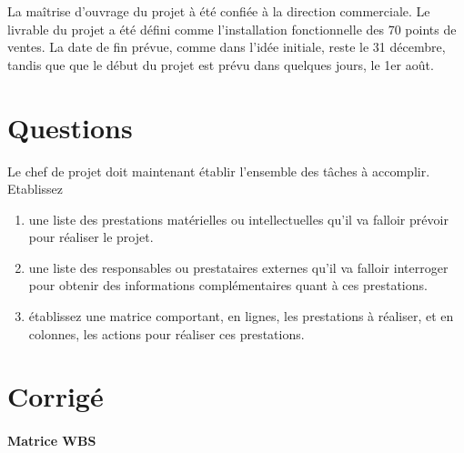 \documentclass[12pt]{article}
\begin{document}
La maîtrise d'ouvrage du projet à été confiée à la direction commerciale.
Le livrable du projet a été défini comme l'installation fonctionnelle des 
70 points de ventes. La date de fin prévue, comme dans l'idée initiale, 
reste le 31 décembre, tandis que que le début du projet est prévu dans 
quelques jours, le 1er août.
\begin{figure}[!htb]
\begin{center}
\end{center}
\end{figure}





\section{Questions}

Le chef de projet doit maintenant établir l'ensemble des tâches à accomplir.
Etablissez 
\begin{enumerate}
\item une liste des prestations matérielles ou intellectuelles qu'il va
falloir prévoir pour réaliser le projet.
\item une liste des responsables ou prestataires externes qu'il va falloir 
interroger pour obtenir des informations complémentaires quant à ces 
prestations.
\item établissez une matrice comportant, en lignes, les prestations 
à réaliser, et en colonnes, les actions pour réaliser ces prestations. 
\end{enumerate}





\section{Corrigé}

\paragraph{Matrice WBS}
~\\	

\end{document}
